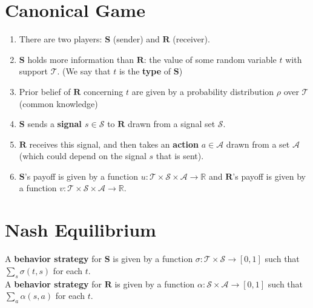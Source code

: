 \documentclass[11pt]{elegantbook}
\begin{document}
\section{Canonical Game}
\begin{definition}
    \normalfont
    \begin{enumerate}
        \item There are two players: $\mathbf{S}$ (sender) and $\mathbf{R}$ (receiver).
        \item $\mathbf{S}$ holds more information than $\mathbf{R}$: the value of some random variable $t$ with support $\mathcal{T}$. (We say that $t$ is the \textbf{type} of $\mathbf{S}$)
        \item Prior belief of $\mathbf{R}$ concerning $t$ are given by a probability distribution $\rho$ over $\mathcal{T}$ (common knowledge)
        \item $\mathbf{S}$ sends a \textbf{signal $s\in \mathcal{S}$} to $\mathbf{R}$ drawn from a signal set $\mathcal{S}$.
        \item $\mathbf{R}$ receives this signal, and then takes an \textbf{action} $a\in \mathcal{A}$ drawn from a set $\mathcal{A}$ (which could depend on the signal $s$ that is sent).
        \item $\mathbf{S}$'s payoff is given by a function $u: \mathcal{T}\times \mathcal{S} \times \mathcal{A} \rightarrow \mathbb{R}$ and $\mathbf{R}$'s payoff is given by a function $v: \mathcal{T}\times \mathcal{S} \times \mathcal{A} \rightarrow \mathbb{R}$.
    \end{enumerate}
\end{definition}

\section{Nash Equilibrium}
\begin{definition}[Strategy]
    \normalfont
    A \textbf{behavior strategy} for $\mathbf{S}$ is given by a function $\sigma: \mathcal{T}\times\mathcal{S} \rightarrow [0,1]$ such that $\sum_s \sigma(t,s)$ for each $t$.\\
    A \textbf{behavior strategy} for $\mathbf{R}$ is given by a function $\alpha: \mathcal{S}\times\mathcal{A} \rightarrow [0,1]$ such that $\sum_a \alpha(s,a)$ for each $t$.
\end{definition}
\end{document}
